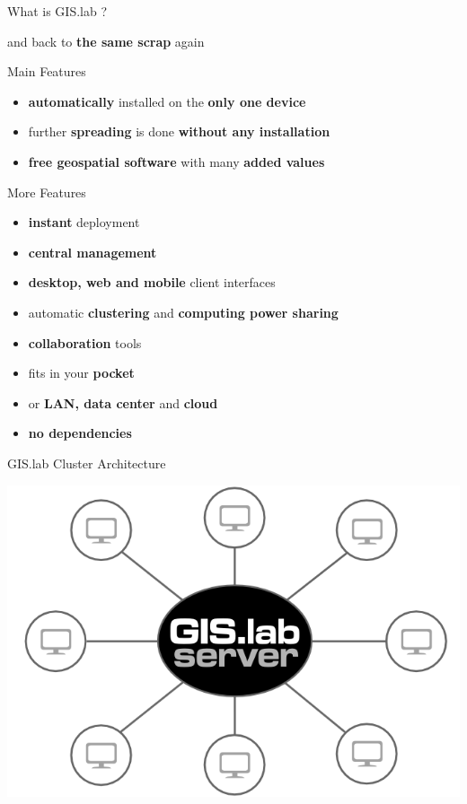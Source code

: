 \documentclass[12pt]{beamer}
\begin{document}
\begin{frame}{What is GIS.lab ?}
	\begin{center}
		and back to \textbf{the same scrap} again
	\end{center}
\end{frame}

\begin{frame}{Main Features}
	\begin{itemize}
		\item \textbf{automatically} installed on the \textbf{only one device}
		\item further \textbf{spreading} is done \textbf{without any installation}
		\item \textbf{free geospatial software} with many \textbf{added values}
	\end{itemize}
\end{frame}

\begin{frame}{More Features}
	\begin{itemize}[<+->]
		\item \textbf{instant} deployment
		\item \textbf{central management}
		\item \textbf{desktop, web and mobile} client interfaces
		\item automatic \textbf{clustering} and \textbf{computing power sharing}
		\item \textbf{collaboration} tools
		\item fits in your \textbf{pocket}
		\item or \textbf{LAN, data center} and \textbf{cloud}
		\item \textbf{no dependencies}
	\end{itemize}
\end{frame}

\begin{frame}{GIS.lab Cluster Architecture}
	\begin{center}
		\includegraphics[keepaspectratio=true,height=0.8\textheight]{images/gislab-cluster-architecture.png}
	\end{center}
\end{frame}
\end{document}
